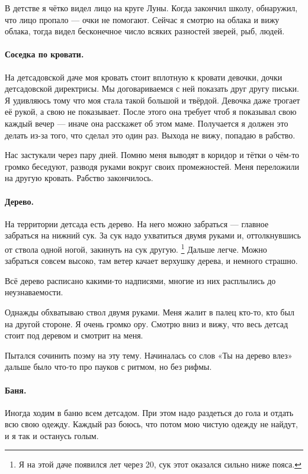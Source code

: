 \documentclass{book}
\begin{document}
В детстве я чётко видел лицо на круге Луны.
Когда закончил школу, обнаружил, что лицо пропало 
--- очки не помогают.
Сейчас я смотрю на облака и вижу облака, тогда видел бесконечное число всяких разностей зверей, рыб, людей.

\paragraph{Соседка по кровати.}
На детсадовской даче моя кровать стоит вплотную к кровати девочки,
дочки детсадовской директрисы.
Мы договариваемся с ней показать друг другу письки.
Я удивляюсь тому что моя стала такой большой и твёрдой.
Девочка даже трогает её рукой, а свою не показывает.
После этого она требует чтоб я показывал свою каждый вечер 
--- иначе она расскажет об этом маме.
Получается я должен это делать из-за того, что сделал это один раз. 
Выхода не вижу, попадаю в рабство.

Нас застукали через пару дней.
Помню меня выводят в коридор и тётки о чём-то громко беседуют, разводя руками вокруг своих промежностей.
Меня переложили на другую кровать. 
Рабство закончилось.

\paragraph{Дерево.}
На территории детсада есть дерево.
На него можно забраться --- главное забраться на нижний сук.
За сук надо ухватиться двумя руками и, оттолкнувшись от ствола одной ногой, закинуть на сук другую.%
\footnote{Я на этой даче появился лет через 20, сук этот оказался сильно ниже пояса.}
Дальше легче.
Можно забраться совсем высоко, там ветер качает верхушку дерева, и немного страшно.

Всё дерево расписано какими-то надписями, 
многие из них расплылись до неузнаваемости.

Однажды обхватываю ствол двумя руками.
Меня жалит в палец кто-то, кто был на другой стороне.
Я очень громко ору.
Смотрю вниз и вижу, что весь детсад стоит под деревом и смотрит на меня.

Пытался сочинить поэму на эту тему.
Начиналась со слов «Ты на дерево влез» дальше было что-то про пауков с ритмом, но без рифмы.

\paragraph{Баня.}
Иногда ходим в баню всем детсадом.
При этом надо раздеться до гола и отдать всю свою одежду.
Каждый раз боюсь, что потом мою чистую одежду не найдут, и я так и останусь голым.
\end{document}

